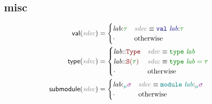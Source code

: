 \documentclass[11pt,fleqn]{article}
\newcommand{\red}[1]{\textcolor{red}{#1}}
\newcommand{\green}[1]{\textcolor{green}{#1}}
\newcommand{\blue}[1]{\textcolor{blue}{#1}}
\newcommand{\purple}[1]{\textcolor{purple}{#1}}
\newcommand{\teal}[1]{\textcolor{teal}{#1}}
\newcommand{\black}[1]{\textcolor{black}{#1}}
\newcommand{\grey}[1]{\textcolor{grey}{#1}}
\newcommand{\redtt}[1]{\red{\mathtt{#1}}}
\newcommand{\greentt}[1]{\green{\mathtt{#1}}}
\newcommand{\bluett}[1]{\blue{\mathtt{#1}}}
\newcommand{\tealtt}[1]{\teal{\mathtt{#1}}}
\newcommand{\greenit}[1]{\green{\mathit{#1}}}
\newcommand{\purpleit}[1]{\purple{\mathit{#1}}}
\newcommand{\tealit}[1]{\teal{\mathit{#1}}}
\newcommand{\greyit}[1]{\grey{\mathit{#1}}}
\newcommand{\typ}[1][]{\greenit{\tau#1}}
\newcommand{\sig}[1][]{\purpleit{\sigma#1}}
\renewcommand{\mod}[1][]{\tealit{\mu#1}}
\newcommand{\lab}[1][]{\mathit{lab#1}}
\newcommand{\Type}{\redtt{Type}}
\newcommand{\SKind}[1]{\redtt{S(#1)}}
\newcommand{\sdec}{\greyit{sdec}}
\newcommand{\OpaqueTypeSdec}[1]{\greentt{type~#1}}
\newcommand{\TransparentTypeSdec}[2]{\greentt{type~#1 = #2}}
\newcommand{\ValSdec}[2]{\bluett{val~#1\TypAnn #2}}
\newcommand{\ModSdec}[2]{\tealtt{module~#1\SigAnn #2}}
\newcommand{\val}[1]{\mathsf{val(}#1\mathsf{)}}
\newcommand{\type}[1]{\mathsf{type(}#1\mathsf{)}}
\newcommand{\submodule}[1]{\mathsf{submodule(}#1\mathsf{)}}
\newcommand{\TypAssump}{\black{:}}
\newcommand{\TypAnn}{\black{:}}
\newcommand{\KndAssump}{\black{::}}
\newcommand{\SigAssump}{\black{:_{\mod}}}
\newcommand{\SigAnn}{\black{:_{\mod}}}
\begin{document}
\subsection*{misc}
\begin{align*}
    \val{\sdec} &=
    \begin{cases}
        \lab\TypAssump\typ & \sdec \equiv \ValSdec{\lab}{\typ} \\
        \cdot & \textrm{otherwise} \\
    \end{cases} \\
    \type{\sdec} &=
    \begin{cases}
        \lab\KndAssump\Type & \sdec \equiv \OpaqueTypeSdec{\lab} \\
        \lab\KndAssump\SKind{\typ} & \sdec \equiv \TransparentTypeSdec{\lab}{\typ} \\
        \cdot & \textrm{otherwise} \\
    \end{cases} \\
    \submodule{\sdec} &=
    \begin{cases}
        \lab\SigAssump\sig & \sdec \equiv \ModSdec{\lab}{\sig} \\
        \cdot & \textrm{otherwise} \\
    \end{cases} \\
\end{align*}
\end{document}
